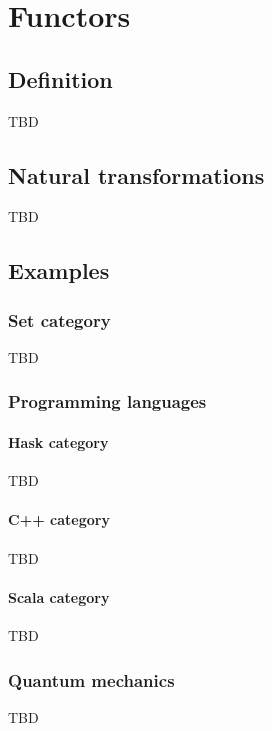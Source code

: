 \chapter{Functors}

\section{Definition}

\begin{definition}[Functor]
\label{def:functor}
TBD
\end{definition}

\section{Natural transformations}

TBD

\section{Examples}

\subsection{\textbf{Set} category}
TBD

\subsection{Programming languages}

\subsubsection{\textbf{Hask} category}
TBD

\subsubsection{\textbf{C++} category}
TBD

\subsubsection{\textbf{Scala} category}
TBD

\subsection{Quantum mechanics}
TBD
